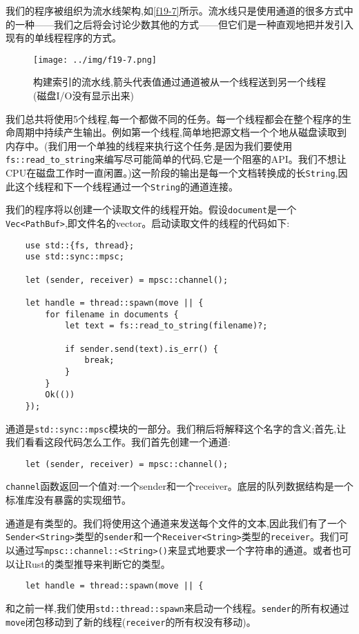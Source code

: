 我们的程序被组织为流水线架构,如\autoref{f19-7}所示。流水线只是使用通道的很多方式中的一种——我们之后将会讨论少数其他的方式——但它们是一种直观地把并发引入现有的单线程程序的方式。

\begin{figure}[htbp]
    \centering
    \texttt{[image: ../img/f19-7.png]}
    \caption{构建索引的流水线,箭头代表值通过通道被从一个线程送到另一个线程(磁盘I/O没有显示出来)}
    \label{f19-7}
\end{figure}

我们总共将使用5个线程,每一个都做不同的任务。每一个线程都会在整个程序的生命周期中持续产生输出。例如第一个线程,简单地把源文档一个个地从磁盘读取到内存中。(我们用一个单独的线程来执行这个任务,是因为我们要使用\texttt{fs::read\_to\_string}来编写尽可能简单的代码,它是一个阻塞的API。我们不想让CPU在磁盘工作时一直闲置。)这一阶段的输出是每一个文档转换成的长\texttt{String},因此这个线程和下一个线程通过一个\texttt{String}的通道连接。

我们的程序将以创建一个读取文件的线程开始。假设\texttt{document}是一个\texttt{Vec<PathBuf>},即文件名的vector。启动读取文件的线程的代码如下:
\begin{verbatim}
    use std::{fs, thread};
    use std::sync::mpsc;

    let (sender, receiver) = mpsc::channel();

    let handle = thread::spawn(move || {
        for filename in documents {
            let text = fs::read_to_string(filename)?;

            if sender.send(text).is_err() {
                break;
            }
        }
        Ok(())
    });
\end{verbatim}

通道是\texttt{std::sync::mpsc}模块的一部分。我们稍后将解释这个名字的含义;首先,让我们看看这段代码怎么工作。我们首先创建一个通道:
\begin{verbatim}
    let (sender, receiver) = mpsc::channel();
\end{verbatim}

\texttt{channel}函数返回一个值对:一个sender和一个receiver。底层的队列数据结构是一个标准库没有暴露的实现细节。

通道是有类型的。我们将使用这个通道来发送每个文件的文本,因此我们有了一个\texttt{Sender<String>}类型的\texttt{sender}和一个\texttt{Receiver<String>}类型的\texttt{receiver}。我们可以通过写\texttt{mpsc::channel::<String>()}来显式地要求一个字符串的通道。或者也可以让Rust的类型推导来判断它的类型。

\begin{verbatim}
    let handle = thread::spawn(move || {
\end{verbatim}
和之前一样,我们使用\texttt{std::thread::spawn}来启动一个线程。\texttt{sender}的所有权通过\texttt{move}闭包移动到了新的线程(\texttt{receiver}的所有权没有移动)。

